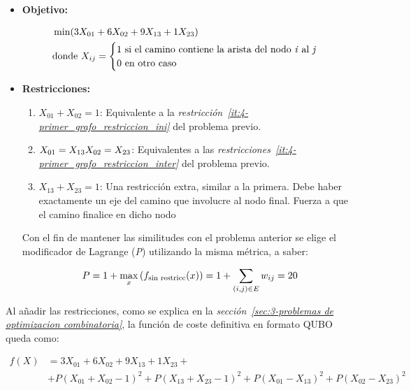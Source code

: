 \begin{itemize}
\item \textbf{Objetivo:}

  \begin{align}
    &\min(3X_{01} + 6X_{02} + 9X_{13} + 1X_{23}) \\
    &\textnormal{donde } X_{ij} = \begin{cases} \nonumber
      1 \textnormal{ si el camino contiene la arista del nodo \textit{i} al \textit{j}} \\
      0 \textnormal{ en otro caso}
    \end{cases}
  \end{align}

\item \textbf{Restricciones:}

  \begin{enumerate}
  \item $X_{01} + X_{02} = 1$: Equivalente a la \textit{restricción~\ref{it:4-primer_grafo_restriccion_ini}} del problema previo.

  \item $X_{01} = X_{13} \\
    X_{02} = X_{23}$: Equivalentes a las \textit{restricciones~\ref{it:4-primer_grafo_restriccion_inter}} del problema previo.

  \item $X_{13} + X_{23} = 1$:  Una restricción extra, similar a la primera.
    Debe haber exactamente un eje del camino que involucre al nodo final.
    Fuerza a que el camino finalice en dicho nodo

  \end{enumerate}

  Con el fin de mantener las similitudes con el problema anterior se elige el modificador de Lagrange (\textit{P}) utilizando la misma métrica, a saber:

  \begin{align}
    P = 1 + \max_{x}{(f_{\textnormal{sin restricc}}(x))} = 1 + \sum_{(i, j)\in{E}}{w_{ij}} = 20
  \end{align}

\end{itemize}

Al añadir las restricciones, como se explica en la \textit{sección~\ref{sec:3-problemas de optimizacion combinatoria}}, la función de coste definitiva en formato QUBO queda como:

\begin{align}
  f(X) &= 3X_{01} + 6X_{02} + 9X_{13} + 1X_{23} + \nonumber \\
       &+ P{(X_{01} + X_{02} - 1)}^2 + P{(X_{13} + X_{23} - 1)}^2 + P{(X_{01} - X_{13})}^2 + P{(X_{02} - X_{23})}^2
\end{align}

